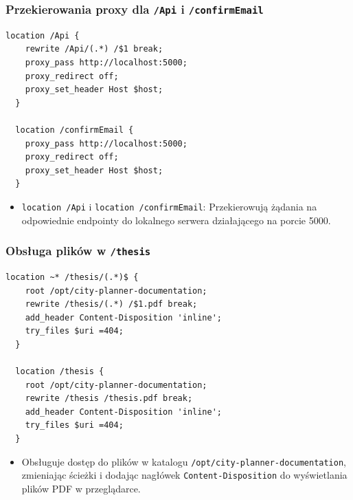 \subsubsection{Przekierowania proxy dla \texttt{/Api} i \texttt{/confirmEmail}}
\begin{lstlisting}[label={lst:n5}]
  location /Api {
    rewrite /Api/(.*) /$1 break;
    proxy_pass http://localhost:5000;
    proxy_redirect off;
    proxy_set_header Host $host;
  }

  location /confirmEmail {
    proxy_pass http://localhost:5000;
    proxy_redirect off;
    proxy_set_header Host $host;
  }
\end{lstlisting}
\begin{itemize}
    \item \texttt{location /Api} i \texttt{location /confirmEmail}: Przekierowują żądania na odpowiednie endpointy do lokalnego serwera działającego na porcie 5000.
\end{itemize}

\subsubsection{Obsługa plików w \texttt{/thesis}}
\begin{lstlisting}[label={lst:n6}]
  location ~* /thesis/(.*)$ {
    root /opt/city-planner-documentation;
    rewrite /thesis/(.*) /$1.pdf break;
    add_header Content-Disposition 'inline';
    try_files $uri =404;
  }

  location /thesis {
    root /opt/city-planner-documentation;
    rewrite /thesis /thesis.pdf break;
    add_header Content-Disposition 'inline';
    try_files $uri =404;
  }
\end{lstlisting}
\begin{itemize}
    \item Obsługuje dostęp do plików w katalogu \texttt{/opt/city-planner-documentation}, zmieniając ścieżki i dodając nagłówek \texttt{Content-Disposition} do wyświetlania plików PDF w przeglądarce.
\end{itemize}

